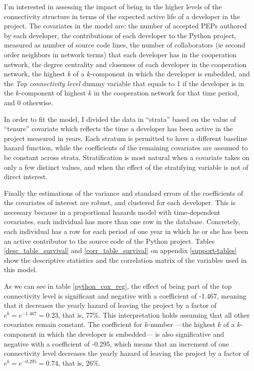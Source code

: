 I'm interested in assessing the impact of being in the higher levels of the connectivity structure in terms of the expected active life of a developer in the project. The covariates in the model are: the number of accepted PEPs authored by each developer, the contributions of each developer to the Python project, measured as number of source code lines, the number of collaborators (ie second order neighbors in network terms) that each developer has in the cooperation network, the degree centrality and closeness of each developer in the cooperation network, the highest $k$ of a $k$-component in which the developer is embedded, and the \emph{Top connectivity level} dummy variable that equals to 1 if the developer is in the $k$-component of highest $k$ in the cooperation network for that time period, and 0 otherwise.



In order to fit the model, I divided the data in ``strata'' based on the value of ``tenure'' covariate which reflects the time a developer has been active in the project measured in years. Each stratum is permitted to have a different baseline hazard function, while the coefficients of the remaining covariates are assumed to be constant across strata. Stratification is most natural when a covariate takes on only a few distinct values, and when the effect of the stratifying variable is not of direct interest.

Finally the estimations of the variance and standard errors of the coefficients of the covariates of interest are robust, and clustered for each developer. This is necessary because in a proportional hazards model with time-dependent covariates, each individual has more than one row in the database. Concretely, each individual has a row for each period of one year in which he or she has been an active contributor to the source code of the Python project. Tables \ref{desc_table_survival} and \ref{corr_table_survival} on appendix \ref{support-tables} show the descriptive statistics and the correlation matrix of the variables used in this model.

As we can see in table \ref{python_cox_reg}, the effect of being part of the top connectivity level is significant and negative with a coefficient of -1.467, meaning that it decreases the yearly hazard of leaving the project by a factor of $e^b = e^{-1.467} = 0.23$, that is, 77\%. This interpretation holds assuming that all other covariates remain constant. The coefficient for $k$-number ---the highest $k$ of a $k$-component in which the developer is embedded--- is also significative and negative with a coefficient of -0.295, which means that an increment of one connectivity level decreases the yearly hazard of leaving the project by a factor of $e^b = e^{-0.295} = 0.74$, that is, 26\%.

